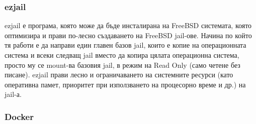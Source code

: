 \documentclass[pdftex,14pt,a4paper]{extreport}
\begin{document}
\subsubsection {ezjail}
ezjail е програма, която може да бъде инсталирана на FreeBSD системата, която оптимизира и прави по-лесно създаването на FreeBSD jail-ове. Начина по който тя работи е да направи един главен базов jail, които е копие на операционната система и всеки следващ jail вместо да копира цялата операционна система, просто му се mount-ва базовия jail, в режим на Read Only (само четене без писане). ezjail прави лесно и ограничаването на системните ресурси (като оперативна памет, приоритет при използването на процесорно време и др.) на jail-а.
\subsubsection {Docker}
\end{document}
